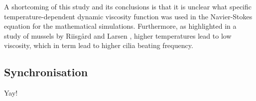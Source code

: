 \documentclass{article}
\theoremstyle{definition}
\numberwithin{equation}{subsection}
\begin{document}
A shortcoming of this study and its conclusions is that it is unclear what specific temperature-dependent dynamic viscosity function was used in the Navier-Stokes equation for the mathematical simulations. Furthermore, as highlighted in a study of mussels by Riisgård and Larsen \cite{riisgardViscositySeawaterControls2007}, higher temperatures lead to low viscosity, which in term lead to higher cilia beating frequency. 

\subsection{Synchronisation}
Yay!

\medskip

\printglossary

\printbibliography
\end{document}
